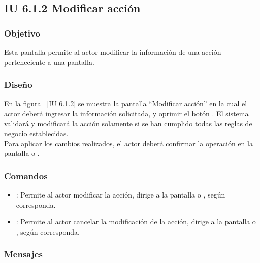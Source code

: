 \subsection{IU 6.1.2 Modificar acción}

\subsubsection{Objetivo}
	
	Esta pantalla permite al actor modificar la información de una acción perteneciente a una pantalla.

\subsubsection{Diseño}

    En la figura ~\ref{IU 6.1.2} se muestra la pantalla ``Modificar acción'' en la cual el actor deberá ingresar la información solicitada, y oprimir el botón . El sistema validará y modificará la acción solamente si se han cumplido todas las reglas de negocio establecidas.  \\
	
	Para aplicar los cambios realizados, el actor deberá confirmar la operación en la pantalla  o .
    

\subsubsection{Comandos}
\begin{itemize}
	\item {}: Permite al actor modificar la acción, dirige a la pantalla  o , según corresponda.
	\item {}: Permite al actor cancelar la modificación de la acción, dirige a la pantalla  o , según corresponda.
\end{itemize}

\subsubsection{Mensajes}

